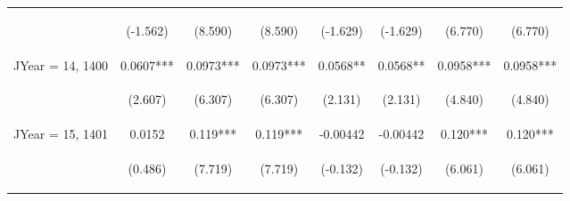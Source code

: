 \documentclass[]{article}
\begin{document}
\begin{center}
\begin{tabular}{lccccccc}
\vspace{4pt} & \begin{footnotesize}(-1.562)\end{footnotesize} & \begin{footnotesize}(8.590)\end{footnotesize} & \begin{footnotesize}(8.590)\end{footnotesize} & \begin{footnotesize}(-1.629)\end{footnotesize} & \begin{footnotesize}(-1.629)\end{footnotesize} & \begin{footnotesize}(6.770)\end{footnotesize} & \begin{footnotesize}(6.770)\end{footnotesize} \\
JYear = 14, 1400 & 0.0607*** & 0.0973*** & 0.0973*** & 0.0568** & 0.0568** & 0.0958*** & 0.0958*** \\
\vspace{4pt} & \begin{footnotesize}(2.607)\end{footnotesize} & \begin{footnotesize}(6.307)\end{footnotesize} & \begin{footnotesize}(6.307)\end{footnotesize} & \begin{footnotesize}(2.131)\end{footnotesize} & \begin{footnotesize}(2.131)\end{footnotesize} & \begin{footnotesize}(4.840)\end{footnotesize} & \begin{footnotesize}(4.840)\end{footnotesize} \\
JYear = 15, 1401 & 0.0152 & 0.119*** & 0.119*** & -0.00442 & -0.00442 & 0.120*** & 0.120*** \\
\vspace{4pt} & \begin{footnotesize}(0.486)\end{footnotesize} & \begin{footnotesize}(7.719)\end{footnotesize} & \begin{footnotesize}(7.719)\end{footnotesize} & \begin{footnotesize}(-0.132)\end{footnotesize} & \begin{footnotesize}(-0.132)\end{footnotesize} & \begin{footnotesize}(6.061)\end{footnotesize} & \begin{footnotesize}(6.061)\end{footnotesize} \\

\end{tabular}
\end{center}
\end{document}
